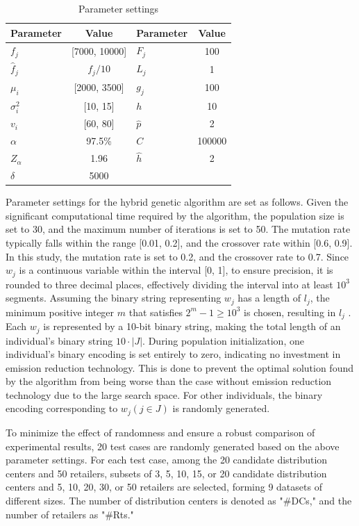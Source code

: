 \documentclass[]{article}
\theoremstyle{plain}%
\theoremstyle{definition}
\theoremstyle{remark}
\theoremstyle{plain}%
\begin{document}
    \begin{table}
    \centering
    \caption{Parameter settings}
    \label{tab:5-1}
    \begin{tabular}{lclc}
    \hline
    \textbf{Parameter} & \textbf{Value} & \textbf{Parameter} & \textbf{Value}  \\
    \hline
    $f_j$ & [7000, 10000]  & $F_j$ & 100 \\
    $\hat{f}_j$ & $f_j/10$ & $L_j$ & 1 \\
    $\mu_i$ & [2000, 3500] & $g_j$ & 100 \\
    $\sigma^2_i$ & [10, 15] & $h$ & 10 \\
    $v_i$ & [60, 80] & $\hat{p}$ & 2 \\
    $\alpha$ & 97.5\% & $C$ & 100000 \\
    $Z_\alpha$ & 1.96 & $\hat{h}$  & 2 \\
    $\delta$ &5000 &&\\
    \hline
    \end{tabular}
    \end{table}
    
    Parameter settings for the hybrid genetic algorithm are set as follows. Given the significant computational time required by the algorithm, the population size is set to 30, and the maximum number of iterations is set to 50. The mutation rate typically falls within the range [0.01, 0.2], and the crossover rate within [0.6, 0.9]. In this study, the mutation rate is set to 0.2, and the crossover rate to 0.7. Since $w_j$ is a continuous variable within the interval [0, 1], to ensure precision, it is rounded to three decimal places, effectively dividing the interval into at least  $10^3$ segments. Assuming the binary string representing $w_j$ has a length of $l_j$, the minimum positive integer $m$ that satisfies $2^m-1 \geq 10^3$ is chosen, resulting in $l_j$ . Each $w_j$ is represented by a 10-bit binary string, making the total length of an individual’s binary string $10 \cdot |J|$. During population initialization, one individual's binary encoding is set entirely to zero, indicating no investment in emission reduction technology. This is done to prevent the optimal solution found by the algorithm from being worse than the case without emission reduction technology due to the large search space. For other individuals, the binary encoding corresponding to $w_j(j\in J)$ is randomly generated. 
    
    To minimize the effect of randomness and ensure a robust comparison of experimental results, 20 test cases are randomly generated based on the above parameter settings. For each test case, among the 20 candidate distribution centers and 50 retailers, subsets of 3, 5, 10, 15, or 20 candidate distribution centers and 5, 10, 20, 30, or 50 retailers are selected, forming 9 datasets of different sizes. The number of distribution centers is denoted as "\#DCs," and the number of retailers as "\#Rts." 
    
\end{document}
